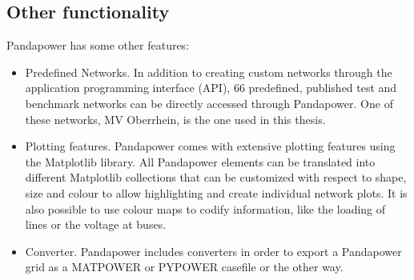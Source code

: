 \subsection{Other functionality}
Pandapower has some other features:
\begin{itemize}
    \item Predefined Networks. In addition to creating custom networks through the application programming interface (\gls{API}), 66 predefined, published test and benchmark networks can be directly accessed through Pandapower. One of these networks, MV Oberrhein, is the one used in this thesis.
    \item Plotting features. Pandapower comes with extensive plotting features using the Matplotlib library. All Pandapower elements can be translated into different Matplotlib collections that can be customized with respect to shape, size and colour to allow highlighting and create individual network plots. It is also possible to use colour maps to codify information, like the loading of lines or the voltage at buses.
    \item Converter. Pandapower includes converters in order to export a Pandapower grid as a MATPOWER or PYPOWER casefile or the other way.
\end{itemize}





